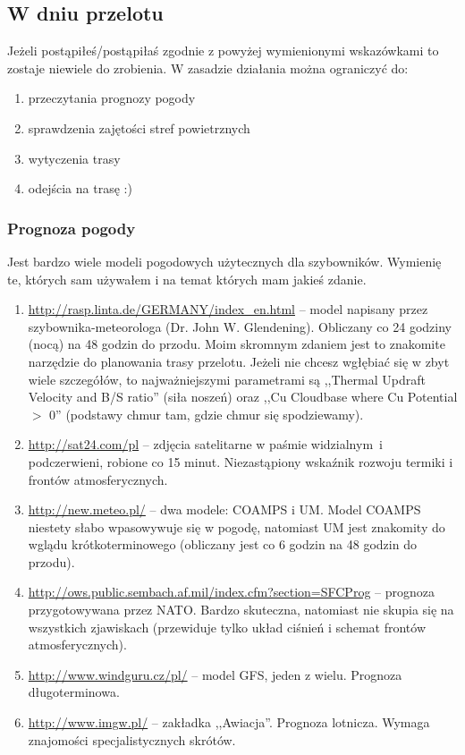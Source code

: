 \documentclass{article}
\begin{document}
\subsection{W dniu przelotu}
Jeżeli postąpiłeś/postąpiłaś zgodnie z powyżej wymienionymi wskazówkami to
zostaje niewiele do zrobienia. W zasadzie działania można ograniczyć do:
\begin{enumerate}
\item przeczytania prognozy pogody
\item sprawdzenia zajętości stref powietrznych
\item wytyczenia trasy
\item odejścia na trasę :)
\end{enumerate}

\subsubsection{Prognoza pogody}
Jest bardzo wiele modeli pogodowych użytecznych dla szybowników. Wymienię
te, których sam używałem i na temat których mam jakieś zdanie.
\begin{enumerate}
\item \url{http://rasp.linta.de/GERMANY/index_en.html} -- model napisany
przez szybownika-meteorologa (Dr. John W. Glendening).
Obliczany co 24 godziny (nocą) na 48 godzin do przodu. Moim skromnym
zdaniem jest to znakomite narzędzie do planowania trasy przelotu.
Jeżeli nie chcesz wgłębiać się w zbyt wiele szczegółów, to najważniejszymi
parametrami są ,,Thermal Updraft Velocity and B/S ratio'' (siła noszeń) oraz
,,Cu Cloudbase where Cu Potential $>$ 0'' (podstawy chmur tam, gdzie chmur
się spodziewamy).

\item \url{http://sat24.com/pl} -- zdjęcia satelitarne w paśmie widzialnym~i
podczerwieni, robione co 15 minut. Niezastąpiony wskaźnik rozwoju termiki
i frontów atmosferycznych.

\item \url{http://new.meteo.pl/} -- dwa modele: COAMPS i UM. Model COAMPS
niestety słabo wpasowywuje się w pogodę, natomiast UM jest znakomity do
wglądu krótkoterminowego (obliczany jest co 6 godzin na 48 godzin do przodu).

\item \url{http://ows.public.sembach.af.mil/index.cfm?section=SFCProg} -- 
prognoza przygotowywana przez NATO. Bardzo skuteczna, natomiast nie
skupia się na wszystkich zjawiskach (przewiduje tylko układ ciśnień i
schemat frontów atmosferycznych).

\item \url{http://www.windguru.cz/pl/} -- model GFS, jeden z wielu.
Prognoza długoterminowa.

\item \url{http://www.imgw.pl/} -- zakładka ,,Awiacja''. Prognoza lotnicza.
Wymaga znajomości specjalistycznych skrótów.

\end{enumerate}
\end{document}
